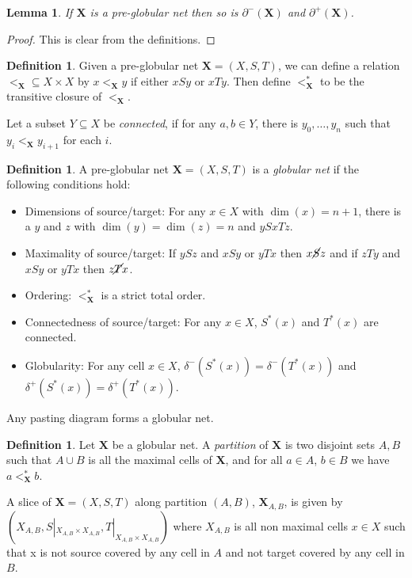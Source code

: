 \documentclass[draft]{article}
\newtheorem{lemma}[theorem]{Lemma} \theoremstyle{definition}
\newtheorem{definition}[theorem]{Definition} \theoremstyle{remark}
\newcommand*{\X}{\ensuremath{\mathbf{X}}}
\begin{document}
\begin{lemma}
  If \(\X\) is a pre-globular net then so is \(\partial^-(\X)\) and \(\partial^+(\X)\).
\end{lemma}
\begin{proof}
  This is clear from the definitions.
\end{proof}

\begin{definition}
  Given a pre-globular net \(\X = (X,S,T)\), we can define a relation \(<_\X \subseteq X \times X\) by \(x <_\X y\) if either \(x S y\) or \(x T y\). Then define \(<_\X^*\) to be the transitive closure of \(<_\X\).

  Let a subset \(Y \subseteq X\) be \emph{connected}, if for any \(a,b \in Y\), there is \(y_0,\dots,y_n\) such that \(y_i <_\X y_{i+1}\) for each \(i\).
\end{definition}

\begin{definition}
  A pre-globular net \(\X = (X,S,T)\) is a \emph{globular net} if the following conditions hold:
  \begin{itemize}
  \item Dimensions of source/target: For any \(x \in X\) with \(\dim(x) = n+1\), there is a \(y\) and \(z\) with \(\dim(y)=\dim(z) = n\) and \(ySxTz\).
  \item Maximality of source/target: If \(ySz\) and \(xSy\) or \(yTx\) then \(x\cancel{S}z\) and if \(zTy\) and \(xSy\) or \(yTx\) then \(z\cancel{T}x\).
  \item Ordering: \(<_\X^*\) is a strict total order.
  \item Connectedness of source/target: For any \(x \in X\), \(S^*(x)\) and \(T^*(x)\) are connected.
  \item Globularity: For any cell \(x \in X\), \(\delta^-(S^*(x)) = \delta^-(T^*(x))\) and \(\delta^+(S^*(x)) = \delta^+(T^*(x))\).
  \end{itemize}
\end{definition}

\begin{prop}
  Any pasting diagram forms a globular net.
\end{prop}

\begin{definition}
  Let \(\X\) be a globular net. A \emph{partition} of \(\X\) is two disjoint sets \(A,B\) such that \(A \cup B\) is all the maximal cells of \(\X\), and for all \(a \in A\), \(b \in B\) we have \(a <_\X^* b\).

  A slice of \(\X = (X,S,T)\) along partition \((A,B)\), \(\X_{A,B}\), is given by \((X_{A,B},S|_{X_{A,B} \times X_{A,B}},T|_{X_{A,B} \times X_{A,B}})\) where \(X_{A,B}\) is all non maximal cells \(x \in X\) such that x is not source covered by any cell in \(A\) and not target covered by any cell in \(B\).
\end{definition}
\end{document}
